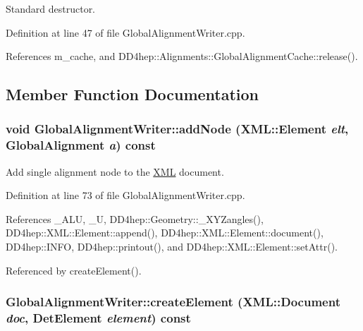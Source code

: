Standard destructor. 

Definition at line 47 of file GlobalAlignmentWriter.cpp.

References m\_\-cache, and DD4hep::Alignments::GlobalAlignmentCache::release().

\subsection{Member Function Documentation}
\hypertarget{class_d_d4hep_1_1_alignments_1_1_global_alignment_writer_ad30459403177b3f6a4fd0e6a4f6d5165}{
\subsubsection[{addNode}]{\setlength{\rightskip}{0pt plus 5cm}void GlobalAlignmentWriter::addNode ({\bf XML::Element} {\em elt}, \/  {\bf GlobalAlignment} {\em a}) const}}
\label{class_d_d4hep_1_1_alignments_1_1_global_alignment_writer_ad30459403177b3f6a4fd0e6a4f6d5165}


Add single alignment node to the \hyperlink{namespace_d_d4hep_1_1_x_m_l}{XML} document. 

Definition at line 73 of file GlobalAlignmentWriter.cpp.

References \_\-ALU, \_\-U, DD4hep::Geometry::\_\-XYZangles(), DD4hep::XML::Element::append(), DD4hep::XML::Element::document(), DD4hep::INFO, DD4hep::printout(), and DD4hep::XML::Element::setAttr().

Referenced by createElement().\hypertarget{class_d_d4hep_1_1_alignments_1_1_global_alignment_writer_adbbbaaf880f8527c01332e7c50a304d3}{
\subsubsection[{createElement}]{ GlobalAlignmentWriter::createElement ({\bf XML::Document} {\em doc}, \/  {\bf DetElement} {\em element}) const}}
\label{class_d_d4hep_1_1_alignments_1_1_global_alignment_writer_adbbbaaf880f8527c01332e7c50a304d3}


